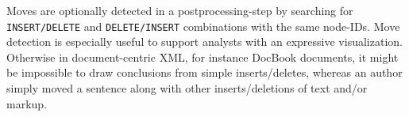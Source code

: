 Moves are optionally detected in a postprocessing-step by searching for \\\texttt{INSERT/DELETE} and \texttt{DELETE/INSERT} combinations with the same node-IDs. Move detection is especially useful to support analysts with an expressive visualization. Otherwise in document-centric XML, for instance DocBook\cite{docbook} documents, it might be impossible to draw conclusions from simple inserts/deletes, whereas an author simply moved a sentence along with other inserts/deletions of text and/or markup.
